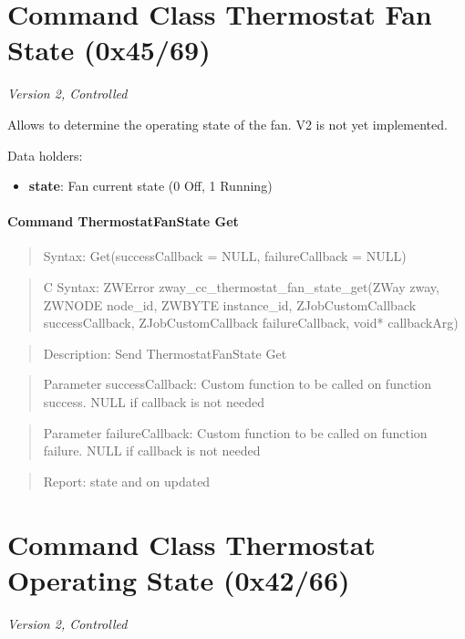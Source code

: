 \section{Command Class Thermostat Fan State (0x45/69)}

\textit{Version 2, Controlled}
\newline

Allows to determine the operating state of the fan. V2 is not yet implemented.
\newline

\noindent
Data holders:

\begin{itemize}
\item \textbf{state}: Fan current state (0 Off, 1 Running)
\end{itemize}

\paragraph{Command ThermostatFanState Get}
\begin{quote}Syntax: Get(successCallback = NULL, failureCallback = NULL)\end{quote}
\begin{quote}C Syntax: ZWError zway\_cc\_thermostat\_fan\_state\_get(ZWay zway, ZWNODE node\_id, ZWBYTE instance\_id, ZJobCustomCallback successCallback, ZJobCustomCallback failureCallback, void* callbackArg)\end{quote}
\begin{quote}Description: Send ThermostatFanState Get\end{quote}
\begin{quote}Parameter successCallback: Custom function to be called on function success. NULL if callback is not needed\end{quote}
\begin{quote}Parameter failureCallback: Custom function to be called on function failure. NULL if callback is not needed\end{quote}
\begin{quote}Report: state and on updated\end{quote}


\section{Command Class Thermostat Operating State (0x42/66)}

\textit{Version 2, Controlled}
\newline


